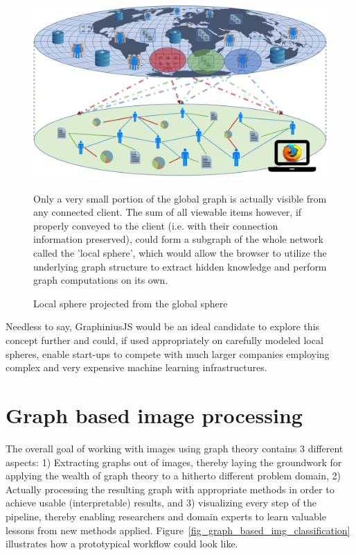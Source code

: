 		
		\begin{figure}[ht]
			\label{fig_local_sphere}
			\begin{center}
				\includegraphics[width=1\textwidth]{figures/local_sphere}
				\caption{Local sphere projected from the global sphere}
			\end{center}
			\small
			Only a very small portion of the global graph is actually visible from any connected client. The sum of all viewable items however, if properly conveyed to the client (i.e. with their connection information preserved), could form a subgraph of the whole network called the 'local sphere', which would allow the browser to utilize the underlying graph structure to extract hidden knowledge and perform graph computations on its own.
		\end{figure}
		
		Needless to say, GraphiniusJS would be an ideal candidate to explore this concept further and could, if used appropriately on carefully modeled local spheres, enable start-ups to compete with much larger companies employing complex and very expensive machine learning infrastructures.
		
	
	\section{Graph based image processing}
	\label{ssect:app_graph_img_proc}
	
	The overall goal of working with images using graph theory contains 3 different aspects: 1) Extracting graphs out of images, thereby laying the groundwork for applying the wealth of graph theory to a hitherto different problem domain, 2) Actually processing the resulting graph with appropriate methods in order to achieve usable (interpretable) results, and 3) visualizing every step of the pipeline, thereby enabling researchers and domain experts to learn valuable lessons from new methods applied. Figure~\ref{fig_graph_based_img_classification} illustrates how a prototypical workflow could look like.
	
